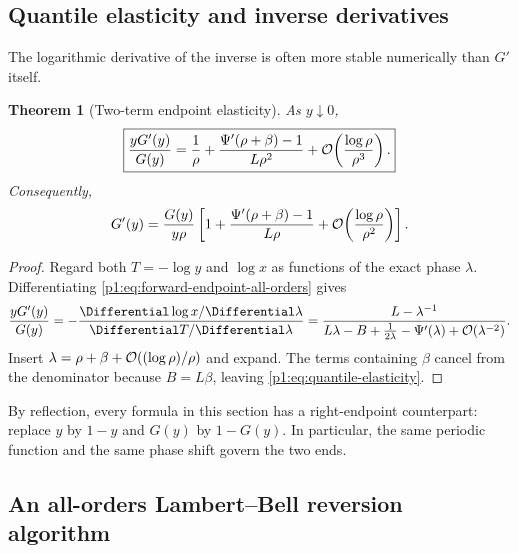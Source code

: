 \documentclass[11pt,oneside]{article}
\numberwithin{equation}{section}
\newtheorem{theorem}{Theorem}[section]
\theoremstyle{definition}
\theoremstyle{remark}
\begin{document}
\subsection{Quantile elasticity and inverse derivatives}

The logarithmic derivative of the inverse is often more stable numerically than $G'$ itself.

\begin{theorem}[Two-term endpoint elasticity]
\label{p1:thm:quantile-elasticity}
As $y\downarrow0$,
\begin{equation}
 \boxed{
 \frac{yG'(y)}{G(y)}
 =\frac1\rho+\frac{\Psi'(\rho+\beta)-1}{L\rho^2}
 +\mathcal O\!\left(\frac{\log\rho}{\rho^3}\right).}
 \label{p1:eq:quantile-elasticity}
\end{equation}
Consequently,
\begin{equation}
 G'(y)=\frac{G(y)}{y\rho}
 \left[1+\frac{\Psi'(\rho+\beta)-1}{L\rho}
 +\mathcal O\!\left(\frac{\log\rho}{\rho^2}\right)\right].
 \label{p1:eq:Gprime-endpoint}
\end{equation}
\end{theorem}

\begin{proof}
Regard both $T=-\log y$ and $\log x$ as functions of the exact phase $\lambda$.
Differentiating \eqref{p1:eq:forward-endpoint-all-orders} gives
\begin{equation}
 \frac{yG'(y)}{G(y)}
 =-\frac{\Differential\log x/\Differential\lambda}{\Differential T/\Differential\lambda}
 =\frac{L-\lambda^{-1}}
 {L\lambda-B+\tfrac1{2\lambda}-\Psi'(\lambda)+\BigO(\lambda^{-2})}.
 \label{p1:eq:elasticity-exact-ratio}
\end{equation}
Insert $\lambda=\rho+\beta+\mathcal O((\log\rho)/\rho)$ and expand.  The terms
containing $\beta$ cancel from the denominator because $B=L\beta$, leaving
\eqref{p1:eq:quantile-elasticity}.
\end{proof}

By reflection, every formula in this section has a right-endpoint counterpart: replace
$y$ by $1-y$ and $G(y)$ by $1-G(y)$.  In particular, the same periodic function and
the same phase shift govern the two ends.

\subsection{An all-orders Lambert--Bell reversion algorithm}
\end{document}
